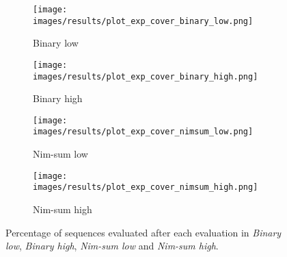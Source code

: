 \begin{figure}[ht]
	\begin{subfigure}{0.49\linewidth}
	\centering
	\texttt{[image: images/results/plot\_exp\_cover\_binary\_low.png]}
	\caption{Binary low}
	\label{fig:exp_cover_binary_low}
	\end{subfigure}
	\hfill
	\begin{subfigure}{0.49\linewidth}
	\centering
	\texttt{[image: images/results/plot\_exp\_cover\_binary\_high.png]}
	\caption{Binary high}
	\label{fig:exp_cover_binary_high}
	\end{subfigure}
	\begin{subfigure}{0.49\linewidth}
	\centering
	\texttt{[image: images/results/plot\_exp\_cover\_nimsum\_low.png]}
	\caption{Nim-sum low}
	\label{fig:exp_cover_nimsum_low}
	\end{subfigure}
	\hfill
	\begin{subfigure}{0.49\linewidth}
	\centering
	\texttt{[image: images/results/plot\_exp\_cover\_nimsum\_high.png]}
	\caption{Nim-sum high}
	\label{fig:exp_cover_nimsum_high}
	\end{subfigure}
	\caption{Percentage of sequences evaluated after each evaluation in
	\emph{Binary low}, \emph{Binary high}, \emph{Nim-sum low} and \emph{Nim-sum
	high}.}
	\label{fig:exp_cover2}
\end{figure}
